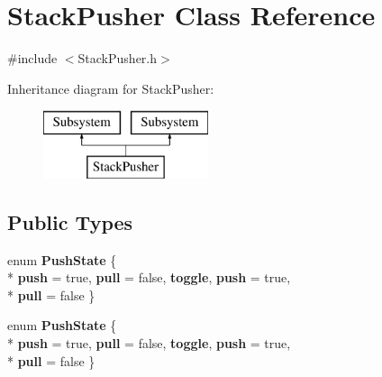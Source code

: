 \hypertarget{class_stack_pusher}{}\section{Stack\+Pusher Class Reference}
\label{class_stack_pusher}


{\ttfamily \#include $<$Stack\+Pusher.\+h$>$}

Inheritance diagram for Stack\+Pusher\+:\begin{figure}[H]
\begin{center}
\leavevmode
\includegraphics[height=2.000000cm]{class_stack_pusher}
\end{center}
\end{figure}
\subsection*{Public Types}
\begin{DoxyCompactItemize}
\item 
\hypertarget{class_stack_pusher_a0ceaed23d26945569ce1ba0f7a0ac03c}{}enum {\bfseries Push\+State} \{ \\*
{\bfseries push} = true, 
{\bfseries pull} = false, 
{\bfseries toggle}, 
{\bfseries push} = true, 
\\*
{\bfseries pull} = false
 \}\label{class_stack_pusher_a0ceaed23d26945569ce1ba0f7a0ac03c}

\item 
\hypertarget{class_stack_pusher_a0ceaed23d26945569ce1ba0f7a0ac03c}{}enum {\bfseries Push\+State} \{ \\*
{\bfseries push} = true, 
{\bfseries pull} = false, 
{\bfseries toggle}, 
{\bfseries push} = true, 
\\*
{\bfseries pull} = false
 \}\label{class_stack_pusher_a0ceaed23d26945569ce1ba0f7a0ac03c}

\end{DoxyCompactItemize}
